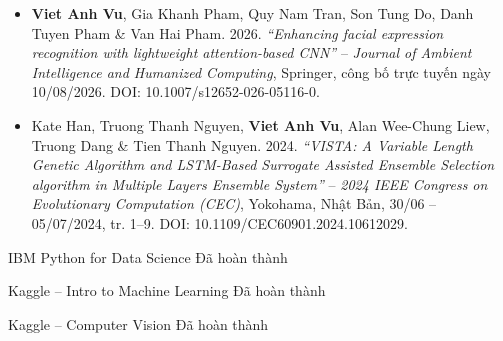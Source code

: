 
\begin{itemize}
  \item \textbf{Viet Anh Vu}, Gia Khanh Pham, Quy Nam Tran, Son Tung Do, Danh Tuyen Pham \& Van Hai Pham. 2026. \textit{``Enhancing facial expression recognition with lightweight attention-based CNN''} -- \emph{Journal of Ambient Intelligence and Humanized Computing}, Springer, công bố trực tuyến ngày 10/08/2026. DOI: 10.1007/s12652-026-05116-0.
  \item Kate Han, Truong Thanh Nguyen, \textbf{Viet Anh Vu}, Alan Wee-Chung Liew, Truong Dang \& Tien Thanh Nguyen. 2024. \textit{``VISTA: A Variable Length Genetic Algorithm and LSTM-Based Surrogate Assisted Ensemble Selection algorithm in Multiple Layers Ensemble System''} -- \emph{2024 IEEE Congress on Evolutionary Computation (CEC)}, Yokohama, Nhật Bản, 30/06 -- 05/07/2024, tr. 1--9. DOI: 10.1109/CEC60901.2024.10612029.
\end{itemize}

\vspace{6pt}


\begin{cvskills}

  \cvskill
    {IBM Python for Data Science}
    {Đã hoàn thành}

  \cvskill
    {Kaggle -- Intro to Machine Learning}
    {Đã hoàn thành}

  \cvskill
    {Kaggle -- Computer Vision}
    {Đã hoàn thành}

\end{cvskills}


